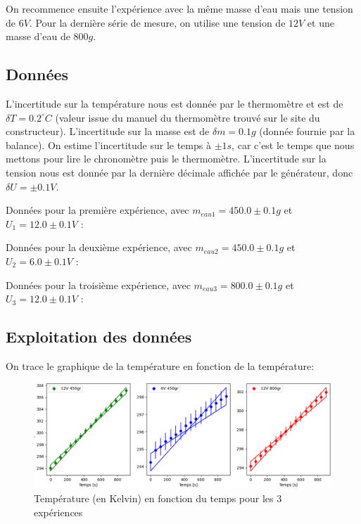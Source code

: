 \documentclass[12pt]{article}
\begin{document}
On recommence ensuite l'expérience avec la même masse d'eau mais une tension de $6V$. Pour la dernière série de mesure, on utilise une tension de $12V$ et une masse d'eau de $800g$.

\subsection{Données}

L'incertitude sur la température nous est donnée par le thermomètre et est de $\delta T = 0.2^\circ C$ (valeur issue du manuel du thermomètre trouvé sur le site du constructeur). 
L'incertitude sur la masse est de $\delta m = 0.1g$ (donnée fournie par la balance). 
On estime l'incertitude sur le temps à $\pm 1s$, car c'est le temps que nous mettons pour lire le chronomètre puis le thermomètre. 
L'incertitude sur la tension nous est donnée par la dernière décimale affichée par le générateur, donc $\delta U = \pm 0.1V$.

	Données pour la première expérience, avec $m_{eau1}=450.0\pm 0.1g$ et $U_1=12.0\pm 0.1V$ :


	Données pour la deuxième expérience, avec $m_{eau2}=450.0\pm 0.1g$ et $U_2=6.0\pm 0.1V$ :
	
	
	Données pour la troisième expérience, avec $m_{eau3}=800.0\pm 0.1g$ et $U_3=12.0\pm 0.1V$ :

\newpage
\subsection{Exploitation des données}

On trace le graphique de la température en fonction de la température:

\begin{figure}[h!]
	\begin{center}
		\includegraphics[scale=0.64]{img/Figure_1.png}
	\end{center}
	\label{fig:graph1}
	\caption{Température (en Kelvin) en fonction du temps pour les 3 expériences}
\end{figure}
\end{document}
